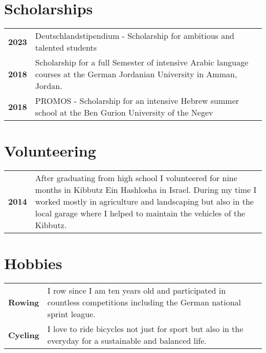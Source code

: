 \documentclass{style/modernsimplecv}
\newlength{\rightcolwidth}
\begin{document}
\begin{paracol}{2}
\begin{minipage}[t]{\rightcolwidth}
\begin{minipage}[t]{\rightcolwidth}
        \section*{Scholarships}
        \begin{tabular}{>{\bfseries}p{} >{}p{}}
            2023 & Deutschlandstipendium -  Scholarship for ambitious and talented students                                                  \\
            2018 & Scholarship for a full Semester of intensive Arabic language courses at the German Jordanian University in Amman, Jordan. \\
            2018 & PROMOS -  Scholarship for an intensive Hebrew summer school at the Ben Gurion University of the Negev                     \\
        \end{tabular}
    \end{minipage}\hfill
    \bigskip
    \begin{minipage}[t]{\rightcolwidth}
        \section*{Volunteering}
        \begin{tabular}{>{\bfseries}p{} >{}p{}}
            2014 & After graduating from high school I volunteered for nine months in Kibbutz Ein Hashlosha in Israel. During my time I worked mostly in agriculture and landscaping but also in the local garage where I helped to maintain the vehicles of the Kibbutz. \\
        \end{tabular}
        \bigskip
        \section*{Hobbies}
        \begin{tabular}{>{\bfseries}p{} >{}p{}}
            Rowing  & I row since I am ten years old and participated in countless competitions including the German national sprint league. \\
            Cycling & I love to ride bicycles not just for sport but also in the everyday for a sustainable and balanced life.
        \end{tabular}
    \end{minipage}
\end{minipage}
\end{paracol}
\end{document}
